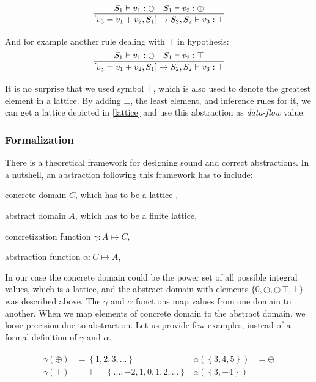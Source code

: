         $$
        \infer{[v_3=v_1+v_2, S_1] \rightarrow S_2, S_2 \vdash v_3 : \top}
        {S_1 \vdash v_1 : \ominus & S_1 \vdash v_2 : \oplus}
        $$        
        
        And for example another rule dealing with $\top$ in hypothesis:
        $$
        \infer{[v_3=v_1+v_2, S_1] \rightarrow S_2, S_2 \vdash v_3 : \top}
        {S_1 \vdash v_1 : \ominus & S_1 \vdash v_2 : \top}
        $$
        
        It is no surprise that we used symbol $\top$, which is also used to denote the 
        greatest element in a lattice. By adding $\bot$, the least element, and inference 
        rules for it, we can get a lattice depicted in \ref{lattice} and use 
        this abstraction as \emph{data-flow} value.
        
        \subsubsection*{Formalization}

        There is a theoretical framework for designing sound and correct 
        abstractions. In a nutshell, an abstraction following this framework 
        has to include: 
        
        \begin{itemize*}
            \item concrete domain $C$, which has to be a lattice ,
            \item abstract domain $A$, which has to be a finite lattice,
            \item concretization function $\gamma{}:A\mapsto{}C$,
            \item abstraction function $\alpha{}:C\mapsto{}A$,
        \end{itemize*}
        
        In our case the concrete domain could be the power set of all 
        possible integral values, which is a lattice, and the abstract 
        domain with elements $\{0, \ominus, \oplus\, \top, \bot\}$ was 
        described above. The $\gamma$ and $\alpha$ functions map values 
        from one domain to another. When we map elements of concrete domain 
        to the abstract domain, we loose precision due to abstraction. 
        Let us provide few examples, instead of a formal definition 
        of $\gamma$ and $\alpha$.
        
        \begin{align*}
            \begin{split}
                \gamma{}(\oplus) &= \left\{1, 2, 3, ...\right\} \\
                \gamma{}(\top) &= \top = \left\{..., -2, 1, 0, 1, 2, ...\right\} \\
            \end{split}
            \begin{split}
                \alpha{}(\left\{3, 4, 5\right\}) &= \oplus \\ 
                \alpha{}(\left\{3, -4\right\}) &= \top \\
            \end{split}
        \end{align*}
        
